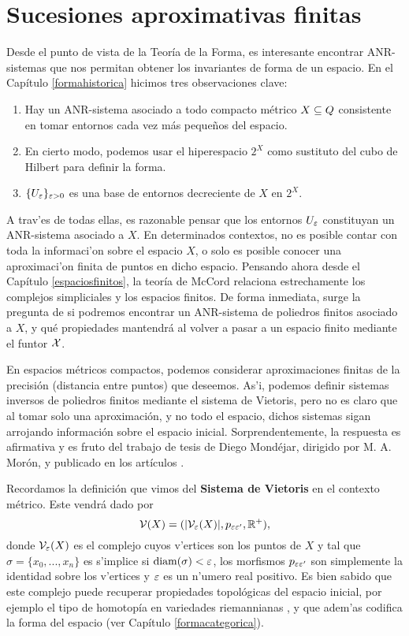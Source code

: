 \chapter{Sucesiones aproximativas finitas}\label{sucesionesaprox}
Desde el punto de vista de la Teoría de la Forma, es interesante encontrar ANR-sistemas que nos permitan obtener los invariantes de forma de un espacio. En el Capítulo \ref{formahistorica} hicimos tres observaciones clave:
\begin{enumerate}
  \item Hay un ANR-sistema asociado a todo compacto métrico $ X\subseteq Q  $ consistente en tomar entornos cada vez más peque\~nos del espacio.
  \item En cierto modo, podemos usar el hiperespacio $ 2^X  $ como sustituto del cubo de Hilbert para definir la forma.
  \item $ \{U_\varepsilon \}_{\varepsilon>0 }$ es una base de entornos decreciente de $ X  $ en $ 2^X  $.
\end{enumerate}
A trav'es de todas ellas, es razonable pensar que los entornos $ U_\varepsilon $ constituyan un ANR-sistema asociado a $ X  $. En determinados contextos, no es posible contar con toda la informaci'on sobre el espacio $X$, o solo es posible conocer una aproximaci'on finita de puntos en dicho espacio. Pensando ahora desde el Capítulo \ref{espaciosfinitos}, la teoría de McCord relaciona estrechamente los complejos simpliciales y los espacios finitos. De forma inmediata, surge la pregunta de si podremos encontrar un ANR-sistema de poliedros finitos asociado a $ X  $, y qué propiedades mantendrá al volver a pasar a un espacio finito mediante el funtor $ \mathcal{X}  $. 

En espacios métricos compactos, podemos considerar aproximaciones finitas de la precisión (distancia entre puntos) que deseemos. As'i, podemos definir sistemas inversos de poliedros finitos mediante el sistema de Vietoris, pero no es claro que al tomar solo una aproximación, y no todo el espacio, dichos sistemas sigan arrojando información sobre el espacio inicial. Sorprendentemente, la respuesta es afirmativa y es fruto del trabajo de tesis de Diego Mondéjar, dirigido por M. A. Morón, y  publicado en los artículos \cite{mondejar2021reconstruction,mondejar2022polyhedral}.

Recordamos la definición que vimos del \textbf{Sistema de Vietoris}  en el contexto métrico. Este vendrá dado por $$\mathcal{V}(X) = (\abs{\mathcal{V}_\varepsilon(X)},p_{\varepsilon\varepsilon'},\mathbb{R}^+),$$ donde $\mathcal{V}_\varepsilon(X) $ es el complejo cuyos v'ertices son los puntos de $X$ y tal que $\sigma = \{x_0,...,x_n\}$ es s'implice si $\operatorname{diam}(\sigma)<\varepsilon $, los morfismos $p_{\varepsilon\varepsilon'}$ son simplemente la identidad sobre los v'ertices y $\varepsilon $ es un n'umero real positivo. Es bien sabido que este complejo puede recuperar propiedades topológicas del espacio inicial, por ejemplo el tipo de homotopía en variedades riemannianas \cite{hausmann1995vietoris,latschev2001vietoris}, y que adem'as codifica la forma del espacio (ver Capítulo \ref{formacategorica}).

